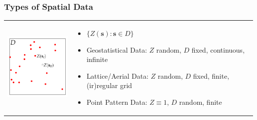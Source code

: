 \documentclass[mathserif,compress]{beamer}\usepackage{graphicx, color}
\def\bit{\begin{itemize}}
\def\eit{\end{itemize}}
\def\bs{\mathbf{s}}
\begin{document}
\begin{frame} [fragile]
\frametitle{Types of Spatial Data}

	\vspace{.2cm}
	\begin{tabular} {p{4cm} p{5cm}}

 		\vspace{.2cm}
		\includegraphics[width=4.0cm]{figure/Notation-plot} &
		\vspace{-.2cm}
		\bit
			\item{$\{Z(\bs):\bs \in D\}$}
			\item{{\color{blue!70!black}Geostatistical Data:} $Z$ random, $D$ fixed, continuous, infinite} 
			\item{{\color{blue!70!black}Lattice/Aerial Data:} $Z$ random, $D$ fixed, finite, (ir)regular grid} 
			\item{{\color{blue!70!black}Point Pattern Data:} $Z \equiv 1$, $D$ random, finite} 
		\eit

	\end{tabular}

\end{frame}
\end{document}
